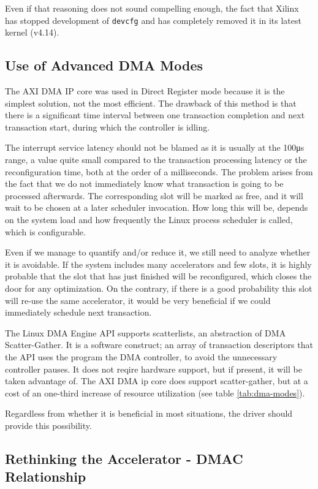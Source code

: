 Even if that reasoning does not sound compelling enough, 
the fact that Xilinx has stopped development of \texttt{devcfg} and has 
completely removed it in its latest kernel (v4.14).

\subsection{Use of Advanced DMA Modes}

The AXI DMA IP core was used in Direct Register mode because it is the simplest solution, not the most efficient.
The drawback of this method is that there is a significant time interval between 
one transaction completion and next transaction start, during which the controller is idling. 

The interrupt service latency should not be blamed as it is usually at the 100μs range,
a value quite small compared to the transaction processing latency or the reconfiguration time,
both at the order of a milliseconds. The problem arises from the fact that we do not immediately
know what transaction is going to be processed afterwards. The corresponding slot will be marked as free,
and it will wait to be chosen at a later scheduler invocation. How long this will be, depends on the system
load and how frequently the Linux process scheduler is called, which is configurable.

Even if we manage to quantify and/or reduce it, we still need to analyze whether it is avoidable.
If the system includes many accelerators and few slots, it is highly probable that the slot that has just finished
will be reconfigured, which closes the door for any optimization. On the contrary, if there is a good probability
this slot will re-use the same accelerator, it would be very beneficial if we could immediately schedule next transaction.

The Linux DMA Engine API supports scatterlists, an abstraction of DMA Scatter-Gather.
It is a software construct; an array of transaction descriptors that the API uses
the program the DMA controller, to avoid the unnecessary controller pauses.
It does not reqire hardware support, but if present, it will be taken advantage of.
The AXI DMA ip core does support scatter-gather,
but at a cost of an one-third increase of resource utilization (see table \ref{tab:dma-modes}).

Regardless from whether it is beneficial in most situations, the driver should provide this possibility.

\subsection{Rethinking the Accelerator - DMAC Relationship}

